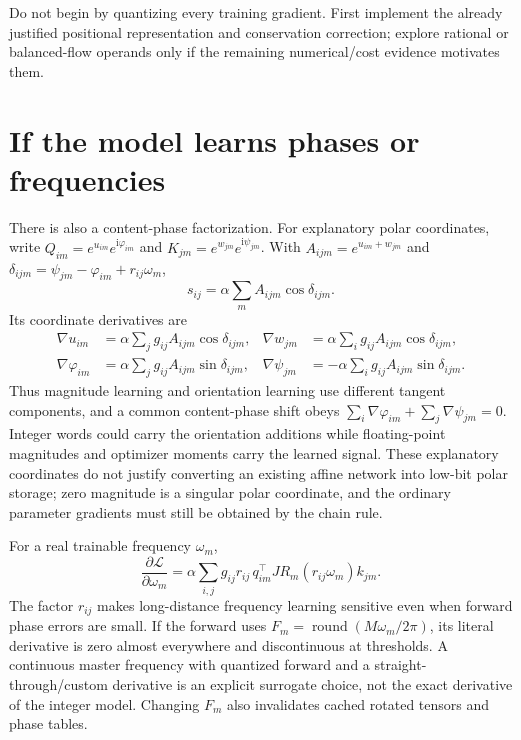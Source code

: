\documentclass[11pt]{article}
\begin{document}
Do not begin by quantizing every training gradient. First implement the already justified positional representation and conservation correction; explore rational or balanced-flow operands only if the remaining numerical/cost evidence motivates them.

\section{If the model learns phases or frequencies}

There is also a content-phase factorization. For explanatory polar coordinates, write $Q_{im}=e^{u_{im}}e^{\mathrm i\varphi_{im}}$ and $K_{jm}=e^{w_{jm}}e^{\mathrm i\psi_{jm}}$. With $A_{ijm}=e^{u_{im}+w_{jm}}$ and $\delta_{ijm}=\psi_{jm}-\varphi_{im}+r_{ij}\omega_m$,
\begin{equation}
 s_{ij}=\alpha\sum_m A_{ijm}\cos\delta_{ijm}.
\end{equation}
Its coordinate derivatives are
\begin{align}
 \nabla u_{im}&=\alpha\sum_jg_{ij}A_{ijm}\cos\delta_{ijm},&
 \nabla w_{jm}&=\alpha\sum_ig_{ij}A_{ijm}\cos\delta_{ijm},\\
 \nabla\varphi_{im}&=\alpha\sum_jg_{ij}A_{ijm}\sin\delta_{ijm},&
 \nabla\psi_{jm}&=-\alpha\sum_ig_{ij}A_{ijm}\sin\delta_{ijm}.
\end{align}
Thus magnitude learning and orientation learning use different tangent components, and a common content-phase shift obeys $\sum_i\nabla\varphi_{im}+\sum_j\nabla\psi_{jm}=0$. Integer words could carry the orientation additions while floating-point magnitudes and optimizer moments carry the learned signal. These explanatory coordinates do not justify converting an existing affine network into low-bit polar storage; zero magnitude is a singular polar coordinate, and the ordinary parameter gradients must still be obtained by the chain rule.

For a real trainable frequency $\omega_m$,
\begin{equation}
 \frac{\partial\mathcal L}{\partial\omega_m}=
 \alpha\sum_{i,j}g_{ij}r_{ij}\,
 q_{im}^\top J R_m(r_{ij}\omega_m)k_{jm}.
\end{equation}
The factor $r_{ij}$ makes long-distance frequency learning sensitive even when forward phase errors are small. If the forward uses $F_m=\operatorname{round}(M\omega_m/2\pi)$, its literal derivative is zero almost everywhere and discontinuous at thresholds. A continuous master frequency with quantized forward and a straight-through/custom derivative is an explicit surrogate choice, not the exact derivative of the integer model. Changing $F_m$ also invalidates cached rotated tensors and phase tables.
\end{document}
